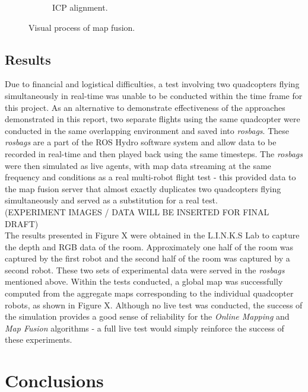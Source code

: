 \documentclass[letterpaper, oneside, 10pt]{report}
\begin{document}
\begin{figure}[h]
\begin{subfigure}[h]{0.31\textwidth}
        \caption{ICP alignment.}
        \label{fig:ICP alignment.}
    \end{subfigure}
    \caption{Visual process of map fusion.}
    \label{fig:Visual process of map fusion.}
\end{figure}

\section{Results}

Due to financial and logistical difficulties, a test involving two quadcopters flying simultaneously in real-time was unable to be conducted within the time frame for this project. As an alternative to demonstrate effectiveness of the approaches demonstrated in this report, two separate flights using the same quadcopter were conducted in the same overlapping environment and saved into \textsl{rosbags}. These \textsl{rosbags} are a part of the ROS Hydro software system and allow data to be recorded in real-time and then played back using the same timesteps. The \textsl{rosbags} were then simulated as live agents, with map data streaming at the same frequency and conditions as a real multi-robot flight test - this provided data to the map fusion server that almost exactly duplicates two quadcopters flying simultaneously and served as a substitution for a real test. \\

(EXPERIMENT IMAGES / DATA WILL BE INSERTED FOR FINAL DRAFT) \\

\noindent The results presented in Figure X were obtained in the L.I.N.K.S Lab to capture the depth and RGB data of the room. Approximately one half of the room was captured by the first robot and the second half of the room was captured by a second robot. These two sets of experimental data were served in the \textsl{rosbags} mentioned above. Within the tests conducted, a global map was successfully computed from the aggregate maps corresponding to the individual quadcopter robots, as shown in Figure X. Although no live test was conducted, the success of the simulation provides a good sense of reliability for the \textsl{Online Mapping} and \textsl{Map Fusion} algorithms - a full live test would simply reinforce the success of these experiments.

\chapter{Conclusions}
\end{document}
